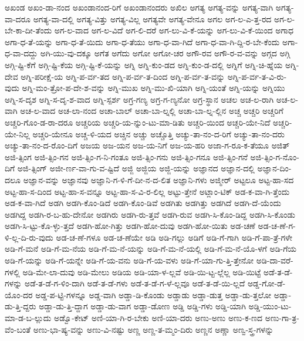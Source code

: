 {ಅಖಂಡ
ಅಖಂ-ಡಾ-ನಂದ
ಅಖಂಡಾನಂದ-ರಿಗೆ
ಅಖಂಡಾನಂದರು
ಅಖಿಲ
ಅಗತ್ಯ
ಅಗತ್ಯ-ವನ್ನು
ಅಗತ್ಯ-ವಾಗಿ
ಅಗತ್ಯ-ವಾ-ದರೂ
ಅಗತ್ಯ-ವಾ-ದಲ್ಲಿ
ಅಗತ್ಯ-ವಿತ್ತು
ಅಗತ್ಯ-ವಿಲ್ಲ
ಅಗತ್ಯವೇ
ಅಗತ್ಯ-ವೇನೂ
ಅಗಲ
ಅಗ-ಲ-ಎ-ತ್ತ-ರದ
ಅಗ-ಲ-ಬೇ-ಕಾ-ದೀ-ತೆಂದು
ಅಗ-ಲ-ವಾದ
ಅಗ-ಲ-ವಿದೆ
ಅಗ-ಲಿ-ದರೆ
ಅಗ-ಲು-ವಿ-ಕೆ-ಯನ್ನು
ಅಗ-ಲು-ವಿ-ಕೆ-ಯಿಂದ
ಅಗಾಧ
ಅಗಾ-ಧ-ತೆ-ಯನ್ನು
ಅಗಾ-ಧ-ತೆ-ಯಿದು
ಅಗಾ-ಧ-ತೆಯು
ಅಗಾ-ಧ-ವಾ-ಗಿದೆ
ಅಗಾ-ಧ-ವಾ-ಗಿ-ದ್ದಿ-ರ-ಬೇ-ಕೆಂದು
ಅಗಾ-ಧ-ವಾ-ದದ್ದು
ಅಗಿ-ಯು-ವು-ದಕ್ಕೂ
ಅಗೆತ
ಅಗೆದು
ಅಗೋ
ಅಗೋ-ಚರ
ಅಗೌ-ರವ
ಅಗೌ-ರ-ವ-ವನ್ನು
ಅಗ್ಗದ
ಅಗ್ಗಿ
ಅಗ್ಗಿ-ಷ್ಟಿ-ಕೆಗೆ
ಅಗ್ಗಿ-ಷ್ಟಿ-ಕೆಯ
ಅಗ್ಗಿ-ಷ್ಟಿ-ಕೆ-ಯನ್ನು
ಅಗ್ನಿ
ಅಗ್ನಿ-ಕುಂ-ಡದ
ಅಗ್ನಿ-ಕುಂ-ಡ-ದಲ್ಲಿ
ಅಗ್ನಿಗೆ
ಅಗ್ನಿ-ಚಿ-ಹ್ನೆಯ
ಅಗ್ನಿ-ದೇವ
ಅಗ್ನಿ-ಪರೀಕ್ಷೆ-ಯ
ಅಗ್ನಿ-ಪ-ರ್ವ-ತದ
ಅಗ್ನಿ-ಪ-ರ್ವ-ತ-ದಿಂದ
ಅಗ್ನಿ-ಪ-ರ್ವ-ತ-ವನ್ನು
ಅಗ್ನಿ-ಪ-ರ್ವ-ತ-ವಿ-ರು-ವುದು
ಅಗ್ನಿ-ಮಂ-ತ್ರೋ-ಪ-ದೇ-ಶ-ವನ್ನು
ಅಗ್ನಿ-ಮುಖ
ಅಗ್ನಿ-ಮು-ಖಿ-ಯಾಗಿ
ಅಗ್ನಿ-ಯಂತೆ
ಅಗ್ನಿ-ಯನ್ನು
ಅಗ್ನಿಯು
ಅಗ್ನಿ-ಸ-ದೃಶ
ಅಗ್ನಿ-ಸ-ದೃ-ಶ-ವಾದ
ಅಗ್ನಿ-ಸ್ಪರ್ಶ
ಅಗ್ರ-ಗಣ್ಯ
ಅಗ್ರ-ಗ-ಣ್ಯನೋ
ಅಗ್ರ-ಸ್ಥಾನ
ಅಚಲ
ಅಚ-ಲ-ರಾಗಿ
ಅಚ-ಲ-ವಾಗಿ
ಅಚ-ಲ-ವಾದ
ಅಚ-ಲಾ-ನಂದ
ಅಚಾ-ಬಾಲ್
ಅಚಾ-ಬಾ-ಲ್ನಲ್ಲಿ
ಅಚಾ-ಬಾ-ಲ್ನ-ಲ್ಲಿನ
ಅಚ್ಚ
ಅಚ್ಚರಿ
ಅಚ್ಚರಿಗೆ
ಅಚ್ಚರಿ-ಗೊಂ-ಡ-ರಾ-ದರೂ
ಅಚ್ಚರಿಯ
ಅಚ್ಚರಿ-ಯ-ನ್ನುಂ-ಟು-ಮಾ-ಡಿತು
ಅಚ್ಚರಿ-ಯಿಂದ
ಅಚ್ಚರಿ-ಯೇ-ನಿದೆ
ಅಚ್ಚರಿ-ಯೇ-ನಿಲ್ಲ
ಅಚ್ಚರಿ-ಯೇನೂ
ಅಚ್ಚ-ಳಿ-ಯದ
ಅಚ್ಚಿನ
ಅಚ್ಚು
ಅಚ್ಚೊತ್ತಿ
ಅಚ್ಯು-ತಾ-ನಂ-ದ-ರಿಗೆ
ಅಚ್ಯು-ತಾ-ನಂ-ದರು
ಅಚ್ಯು-ತಾ-ನಂ-ದ-ರೊಂ-ದಿಗೆ
ಅಜಯ
ಅಜ-ಯನ
ಅಜ-ಯ-ನಿಗೆ
ಅಜ-ಯ-ಹರಿ
ಅಜಾ-ಗ-ರೂ-ಕ-ತೆಯೂ
ಅಜಿತ್
ಅಜಿ-ತ್ಸಿಂಗ
ಅಜಿ-ತ್ಸಿಂ-ಗನ
ಅಜಿ-ತ್ಸಿಂ-ಗ-ನಿ-ಗಂತೂ
ಅಜಿ-ತ್ಸಿಂ-ಗನು
ಅಜಿ-ತ್ಸಿಂ-ಗನೂ
ಅಜಿ-ತ್ಸಿಂ-ಗನೆ
ಅಜಿ-ತ್ಸಿಂ-ಗ-ನೊಂ-ದಿಗೆ
ಅಜಿ-ತ್ಸಿಂಗ್
ಅಜೀ-ರ್ಣ-ವಾ-ಗು-ವ-ಷ್ಟಿದೆ
ಅಜ್ಜಿ
ಅಜ್ಜಿಯ
ಅಜ್ಜಿ-ಯನ್ನು
ಅಜ್ಞಾನದ
ಅಜ್ಞಾನ-ದಲ್ಲಿ
ಅಜ್ಞಾನ-ದಿಂ-ದಲೂ
ಅಜ್ಞಾನ-ವನ್ನು
ಅಜ್ಞಾನವು
ಅಜ್ಞಾನಿ-ಗ-ಳಿ-ಗೆ-ದೀ-ನ-ದ-ಲಿತ
ಅಜ್ಞಾನಿ-ಗಳು
ಅಜ್ಮೀರ್
ಅಟ್ಟಲೂ
ಅಟ್ಟ-ಹಾ-ಸದ
ಅಟ್ಟ-ಹಾ-ಸ-ದಿಂದ
ಅಟ್ಟ-ಹಾ-ಸ-ವನ್ನೂ
ಅಟ್ಟ-ಹಾ-ಸ-ವಿ-ರ-ಲಿಲ್ಲ
ಅಟ್ಟು-ತ್ತೇನೆ
ಅಟ್ಲಾಂ-ಟಿಕ್
ಅಡ-ಕ-ವಾ-ಗಿ-ತ್ತೆಂದು
ಅಡ-ಕ-ವಾ-ಗಿದೆ
ಅಡಗಿ
ಅಡಗಿ-ಕೊಂ-ಡಿದೆ
ಅಡಗಿ-ಕೊಂ-ಡಿವೆ
ಅಡಗಿತು
ಅಡಗಿತ್ತು
ಅಡಗಿದೆ
ಅಡಗಿ-ದೆ-ಯೆಂದು
ಅಡಗಿದ್ದ
ಅಡಗಿ-ರ-ಬ-ಹು-ದೇನೋ
ಅಡಗಿರು
ಅಡಗಿ-ರು-ತ್ತವೆ
ಅಡಗಿ-ರುವ
ಅಡಗಿ-ಸಿ-ಕೊಂ-ಡಿದ್ದ
ಅಡಗಿ-ಸಿ-ಕೊಂಡು
ಅಡಗಿ-ಸಿ-ಟ್ಟು-ಕೊ-ಳ್ಳು-ತ್ತದೆ
ಅಡಗಿ-ಹೋ-ಗಿತ್ತು
ಅಡಗಿ-ಹೋ-ದುವು
ಅಡಗಿ-ಹೋ-ಯಿತು
ಅಡ-ಚಣೆ
ಅಡ-ಚ-ಣೆ-ಗ-ಳಿ-ಲ್ಲ-ದಿ-ರು-ವುದು
ಅಡ-ಚ-ಣೆ-ಗಳೂ
ಅಡ-ಚ-ಣೆಯೇ
ಅಡಿ
ಅಡಿ-ಗಲ್ಲು
ಅಡಿಗೆ
ಅಡಿ-ಗೆ-ಗಾಗಿ
ಅಡಿ-ಗೆ-ಪಾ-ತ್ರೆ-ಗಳೇ
ಅಡಿ-ಗೆ-ಮನೆ
ಅಡಿ-ಗೆ-ಮ-ನೆಯ
ಅಡಿ-ಗೆ-ಮ-ನೆ-ಯನ್ನು
ಅಡಿ-ಗೆ-ಮ-ನೆ-ಯಲ್ಲಿ
ಅಡಿ-ಗೆ-ಮ-ನೆ-ಯೊ-ಳಗೆ
ಅಡಿ-ಗೆಯ
ಅಡಿ-ಗೆ-ಯನ್ನು
ಅಡಿ-ಗೆ-ಯನ್ನೇ
ಅಡಿ-ಗೆ-ಯ-ವನು
ಅಡಿ-ಗೆ-ಯ-ವಳು
ಅಡಿ-ಗೆ-ಯಾ-ಗು-ತ್ತಿ-ತ್ತೇನೋ
ಅಡಿ-ದಾ-ವರೆ-ಗಳಲ್ಲಿ
ಅಡಿ-ಮೇ-ಲಾ-ದುವು
ಅಡಿ-ಮೇಲು
ಅಡಿಯ
ಅಡಿ-ಯಾ-ಳ-ಲ್ಲವೆ
ಅಡಿ-ಯಿ-ಟ್ಟ-ಲ್ಲೆಲ್ಲ
ಅಡಿ-ಯಿಟ್ಟೆ
ಅಡೆ-ತ-ಡೆ-ಗಳನ್ನು
ಅಡೆ-ತ-ಡೆ-ಗ-ಳಿಂ-ದಾಗಿ
ಅಡೆ-ತ-ಡೆ-ಗಳು
ಅಡೆ-ತ-ಡೆ-ಗ-ಳೆ-ಲ್ಲವೂ
ಅಡೆ-ತ-ಡೆ-ಯಿ-ಲ್ಲದೆ
ಅಡ್ಡ-ಗೋ-ಡೆ-ಯೊಂ-ದರ
ಅಡ್ಡ-ಪ-ಟ್ಟಿ-ಗಳನ್ನೂ
ಅಡ್ಡ-ವಾಗಿ
ಅಡ್ಡಾ-ಡಿ-ಕೊಂಡು
ಅಡ್ಡಾಡು
ಅಡ್ಡಾ-ಡುತ್ತ
ಅಡ್ಡಾ-ಡು-ತ್ತಲೋ
ಅಡ್ಡಾ-ಡು-ತ್ತಿ-ದ್ದರು
ಅಡ್ಡಾ-ಡು-ತ್ತಿ-ದ್ದಾಗ
ಅಡ್ಡಾ-ಡು-ವಾಗ
ಅಡ್ಡಾ-ಡೋಣ
ಅಡ್ಡಿ
ಅಡ್ಡಿ-ಗಳು
ಅಡ್ಡಿ-ಯಾಗಿ
ಅಡ್ಡಿ-ಯುಂ-ಟು-ಮಾ-ಡ-ಬ-ಲ್ಲುದು
ಅಡ್ವೊ-ಕೇಟ್
ಅಣಿ-ಯಾ-ಗಿ-ರ-ಬೇಕು
ಅಣಿ-ಯಾ-ದರು
ಅಣು-ಅಣು
ಅಣು-ಕ-ಣದ
ಅಣು-ಗಾ-ತ್ರ-ವೆಂ-ಬಂತೆ
ಅಣು-ಭಾ-ಷ್ಯ-ವನ್ನು
ಅಣು-ವಿ-ನಷ್ಟು
ಅಣ್ಣ
ಅಣ್ಣ-ತ-ಮ್ಮಂ-ದಿರು
ಅಣ್ಣನ
ಅಣ್ಣಾ
ಅಣ್ವ-ಸ್ತ್ರ-ಗಳನ್ನು
}
